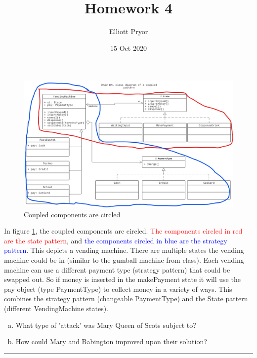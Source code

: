 \documentclass[11pt]{article}
\title{Homework 4}
\author{Elliott Pryor}
\date{15 Oct 2020}
\begin{document}
\maketitle


\begin{figure}[H]
    \centering
    \includegraphics[scale=0.5]{./circled_components.png}
    \caption{Coupled components are circled}
    \label{fig:circled}
\end{figure}

In figure \ref{fig:circled}, the coupled components are circled. \textcolor{red}{The components circled in red are the state pattern}, and \textcolor{blue}{the components circled in blue are the strategy pattern}. This depicts a vending machine. There are multiple states the vending machine could be in (similar to the gumball machine from class). Each vending machine can use a different payment type (strategy pattern) that could be swapped out. So if money is inserted in the makePayment state it will use the pay object (type PaymentType) to collect money in a variety of ways. This combines the strategy pattern (changeable PaymentType) and the State pattern (different VendingMachine states).






\begin{enumerate}[a)]
\item What type of 'attack' was Mary Queen of Scots subject to?
\item How could Mary and Babington improved upon their solution?
\end{enumerate}

\hrule
\end{document}
